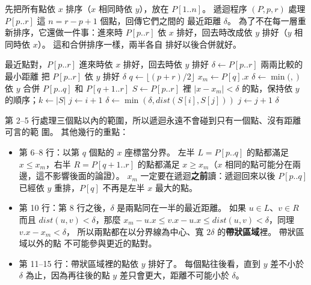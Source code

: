 先把所有點依 $x$ 排序（$x$ 相同時依 $y$），放在 $P[1..n]$。 遞迴程序
$(P, p, r)$ 處理 $P[p..r]$ 這 $n = r - p + 1$ 個點，回傳它們之間的
最近距離 $\delta$。 為了不在每一層重新排序，它還做一件事：進來時 $P[p..r]$ 依
$x$ 排好，回去時改成依 $y$ 排好（$y$ 相同時依 $x$）。 這和合併排序一樣，兩半各自
排好以後合併就好。

\begin{pseudo}[label=alg:dc-closest]{最近點對，$P[p..r]$ 進來時依 $x$ 排好，回去時依 $y$ 排好}
        \State $\delta \gets P[p..r]$ 兩兩比較的最小距離
        \State 把 $P[p..r]$ 依 $y$ 排好
        \State \Return $\delta$
    \EndIf
    \State $q \gets \lfloor (p + r)/2 \rfloor$
    \State $x_m \gets P[q].x$ 
    \State $\delta \gets \min($$,\ $$)$
    \State 依 $y$ 合併 $P[p..q]$ 和 $P[q+1..r]$ 
    \State $S \gets P[p..r]$ 裡 $|x - x_m| < \delta$ 的點，保持依 $y$ 的順序；$k \gets |S|$
        \State $j \gets i + 1$
            \State $\delta \gets \min(\delta, \mathit{dist}(S[i], S[j]))$
            \State $j \gets j + 1$
        \EndWhile
    \EndFor
    \State \Return $\delta$
\EndFunction
\end{pseudo}

第 2--5 行處理三個點以內的範圍，所以遞迴永遠不會碰到只有一個點、沒有距離可言的範
圍。 其他幾行的重點：

\begin{itemize}
\item 第 6--8 行：以第 $q$ 個點的 $x$ 座標當分界。 左半 $L = P[p..q]$ 的點都滿足
$x \le x_m$，右半 $R = P[q+1..r]$ 的點都滿足 $x \ge x_m$（$x$ 相同的點可能分在兩
邊，這不影響後面的論證）。 $x_m$ 一定要在遞迴\textbf{之前}讀：遞迴回來以後
$P[p..q]$ 已經依 $y$ 重排，$P[q]$ 不再是左半 $x$ 最大的點。
\item 第 10 行：第 8 行之後，$\delta$ 是兩點同在一半的最近距離。 如果 $u \in L$、$v \in R$ 而且 $\mathit{dist}(u, v) < \delta$，那麼
$x_m - u.x \le v.x - u.x \le \mathit{dist}(u, v) < \delta$，同理 $v.x - x_m < \delta$，
所以兩點都在以分界線為中心、寬 $2\delta$ 的\textbf{帶狀區域}裡。 帶狀區域以外的點
不可能參與更近的點對。
\item 第 11--15 行：帶狀區域裡的點依 $y$ 排好了。 每個點往後看，直到 $y$ 差不小於
$\delta$ 為止，因為再往後的點 $y$ 差只會更大，距離不可能小於 $\delta$。
\end{itemize}

